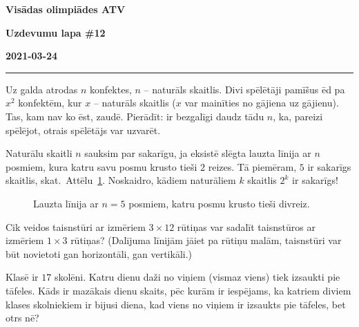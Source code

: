 \documentclass[a4paper,12pt]{article}
\begin{document}
\clearpage
\begin{center}
\parbox{3.5cm}{\flushleft\bf Visādas olimpiādes \newline ATV} \hfill {\bf\LARGE Uzdevumu lapa \#12} \hfill \parbox{3.5cm}{\flushright\bf 2021-03-24} %
\end{center}

\hrule


\vspace{10pt}
\begin{problem}
Uz galda atrodas $n$ konfektes, $n$ – naturāls skaitlis. Divi spēlētāji pamīšus ēd pa $x^2$ konfektēm, 
kur $x$ – naturāls skaitlis ($x$ var mainīties no gājiena uz gājienu). 
Tas, kam nav ko ēst, zaudē. Pierādīt: ir bezgalīgi daudz tādu $n$, 
ka, pareizi spēlējot, otrais spēlētājs var uzvarēt.
\end{problem}

\vspace{10pt}
\begin{problem}
Naturālu skaitli $n$ sauksim par sakarīgu, ja eksistē slēgta lauzta līnija ar $n$ posmiem, 
kura katru savu posmu krusto tieši $2$ reizes. Tā piemēram, $5$ ir sakarīgs 
skaitlis, skat.\ Attēlu~\ref{fig:star}. Noskaidro, kādiem naturāliem $k$ skaitlis $2^k$ ir sakarīgs!
\begin{figure}[!htb]
\caption{\label{fig:star} Lauzta līnija ar $n=5$ posmiem, katru posmu krusto tieši divreiz.}
\end{figure}
\end{problem}

\vspace{10pt}
\begin{problem}
Cik veidos taisnstūri ar izmēriem $3 \times 12$ rūtiņas var sadalīt taisnstūros ar izmēriem $1 \times 3$ rūtiņas? 
(Dalījuma līnijām jāiet pa rūtiņu malām, taisnstūri var būt novietoti gan horizontāli, gan vertikāli.)
\end{problem}


\vspace{10pt}
\begin{problem}
Klasē ir $17$ skolēni. Katru dienu daži no viņiem (vismaz viens) tiek izsaukti pie tāfeles. 
Kāds ir mazākais dienu skaits, pēc kurām ir iespējams, ka katriem diviem klases skolniekiem 
ir bijusi diena, kad viens no viņiem ir izsaukts pie tāfeles, bet otrs nē?
\end{problem}
\end{document}
